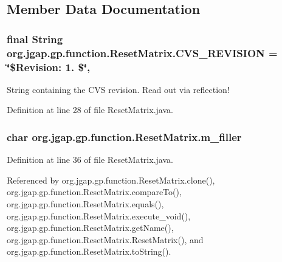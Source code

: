 \subsection{Member Data Documentation}
\hypertarget{classorg_1_1jgap_1_1gp_1_1function_1_1_reset_matrix_a9314847eb1a3d6e32476a4838d7bf7a2}{
\subsubsection[{C\-V\-S\-\_\-\-R\-E\-V\-I\-S\-I\-O\-N}]{\setlength{\rightskip}{0pt plus 5cm}final String org.\-jgap.\-gp.\-function.\-Reset\-Matrix.\-C\-V\-S\-\_\-\-R\-E\-V\-I\-S\-I\-O\-N = \char`\"{}\$Revision\-: 1. \$\char`\"{}\hspace{0.3cm}{\ttfamily [static]}, {\ttfamily [private]}}}\label{classorg_1_1jgap_1_1gp_1_1function_1_1_reset_matrix_a9314847eb1a3d6e32476a4838d7bf7a2}
String containing the C\-V\-S revision. Read out via reflection! 

Definition at line 28 of file Reset\-Matrix.\-java.

\hypertarget{classorg_1_1jgap_1_1gp_1_1function_1_1_reset_matrix_a0747c94394309e906ecb73f3bd3e6462}{
\subsubsection[{m\-\_\-filler}]{\setlength{\rightskip}{0pt plus 5cm}char org.\-jgap.\-gp.\-function.\-Reset\-Matrix.\-m\-\_\-filler\hspace{0.3cm}{\ttfamily [private]}}}\label{classorg_1_1jgap_1_1gp_1_1function_1_1_reset_matrix_a0747c94394309e906ecb73f3bd3e6462}


Definition at line 36 of file Reset\-Matrix.\-java.



Referenced by org.\-jgap.\-gp.\-function.\-Reset\-Matrix.\-clone(), org.\-jgap.\-gp.\-function.\-Reset\-Matrix.\-compare\-To(), org.\-jgap.\-gp.\-function.\-Reset\-Matrix.\-equals(), org.\-jgap.\-gp.\-function.\-Reset\-Matrix.\-execute\-\_\-void(), org.\-jgap.\-gp.\-function.\-Reset\-Matrix.\-get\-Name(), org.\-jgap.\-gp.\-function.\-Reset\-Matrix.\-Reset\-Matrix(), and org.\-jgap.\-gp.\-function.\-Reset\-Matrix.\-to\-String().

